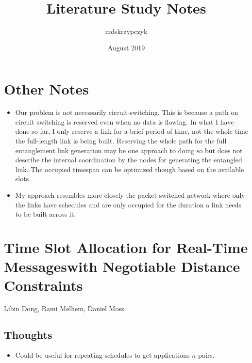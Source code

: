 \documentclass{article}
\title{Literature Study Notes}
\author{mdskrzypczyk }
\date{August 2019}
\begin{document}
\maketitle

\section{Other Notes}
\begin{itemize}
    \item Our problem is not necessarily circuit-switching.  This is because a path on circuit switching is reserved even when no data is flowing.  In what I have done so far, I only reserve a link for a brief period of time, not the whole time the full-length link is being built.  Reserving the whole path for the full entanglement link generation may be one approach to doing so but does not describe the internal coordination by the nodes for generating the entangled link.  The occupied timespan can be optimized though based on the available slots.
    \item My approach resembles more closely the packet-switched network where only the links have schedules and are only occupied for the duration a link needs to be built across it.
\end{itemize}

\section{Time Slot Allocation for Real-Time Messageswith Negotiable Distance Constraints}
Libin Dong, Rami Melhem, Daniel Moss

\subsection{Thoughts}
\begin{itemize}
    \item Could be useful for repeating schedules to get applications $n$ pairs.
\end{itemize}
\end{document}
